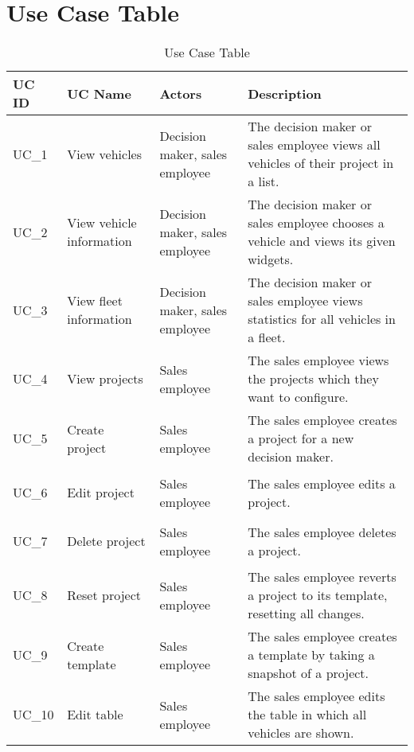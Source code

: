 \section{Use Case Table}
\sffamily
\begin{footnotesize}
  \renewcommand{\arraystretch}{1.4}
  \begin{longtable}[i i i L]{ p{} p{} p{} p{} }
    \caption                       %
        {Use Case Table} %
        \\
    \toprule
    \textbf{UC ID} & \textbf{UC Name} & \textbf{Actors}  & \textbf{Description}\\
    \midrule
    \hypertarget{Ref:UC1}{UC\_1} & View vehicles & Decision maker, sales employee & The decision maker or sales employee views all vehicles of their project in a list.\\
    \hypertarget{Ref:UC2}{UC\_2} & View vehicle information & Decision maker, sales employee & The decision maker or sales employee chooses a vehicle and views its given \glspl{widget}.\\
    \hypertarget{Ref:UC3}{UC\_3}  & View fleet information & Decision maker, sales employee & The decision maker or sales employee views statistics for all vehicles in a fleet.\\
    \hypertarget{Ref:UC4}{UC\_4}  & View projects & Sales employee & The sales employee views the projects which they want to configure.\\
    \hypertarget{Ref:UC5}{UC\_5} & Create project & Sales employee & The sales employee creates a project for a new decision maker.\\
    \hypertarget{Ref:UC6}{UC\_6} & Edit project & Sales employee & The sales employee edits a project.\\
    \hypertarget{Ref:UC7}{UC\_7} & Delete project & Sales employee & The sales employee deletes a project.\\
    \hypertarget{Ref:UC8}{UC\_8} & Reset project & Sales employee & The sales employee reverts a project to its template, resetting all changes.\\
    \hypertarget{Ref:UC9}{UC\_9} & Create template & Sales employee & The sales employee creates a template by taking a snapshot of a project.\\
    \hypertarget{Ref:UC10}{UC\_10} & Edit table & Sales employee & The sales employee edits the table in which all vehicles are shown.\\

\end{longtable}
\end{footnotesize}
